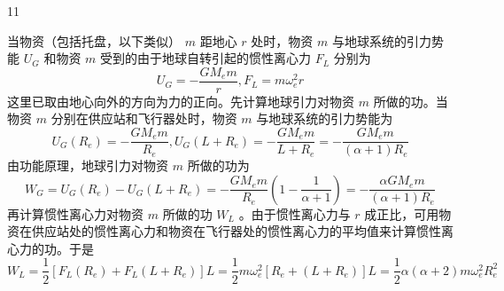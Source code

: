 \begin{solution}{11}
\begin{subsolution}
当物资（包括托盘，以下类似） $m$ 距地心 $r$ 处时，物资 $m$ 与地球系统的引力势能 $U_{G}$ 和物资 $m$ 受到的由于地球自转引起的惯性离心力 $F_{L}$ 分别为
\begin{equation}
U _ {G} = - \frac {G M _ {e} m}{r}, F _ {L} = m \omega_ {e} ^ {2} r
\label{eq:1.s11}
\end{equation}
这里已取由地心向外的方向为力的正向。先计算地球引力对物资 $m$ 所做的功。当物资 $m$ 分别在供应站和飞行器处时，物资 $m$ 与地球系统的引力势能为
\begin{equation}
U _ {G} \left(R _ {e}\right) = - \frac {G M _ {e} m}{R _ {e}}, U _ {G} \left(L + R _ {e}\right) = - \frac {G M _ {e} m}{L + R _ {e}} = - \frac {G M _ {e} m}{(\alpha + 1) R _ {e}}
\label{eq:2.s11}
\end{equation}
由功能原理，地球引力对物资 $m$ 所做的功为
\begin{equation}
W _ {G} = U _ {G} \left(R _ {e}\right) - U _ {G} \left(L + R _ {e}\right) = - \frac {G M _ {e} m}{R _ {e}} \left(1 - \frac {1}{\alpha + 1}\right) = - \frac {\alpha G M _ {e} m}{(\alpha + 1) R _ {e}}
\label{eq:3.s11}
\end{equation}
再计算惯性离心力对物资 $m$ 所做的功 $W_{L}$ 。由于惯性离心力与 $r$ 成正比，可用物资在供应站处的惯性离心力和物资在飞行器处的惯性离心力的平均值来计算惯性离心力的功。于是
\begin{equation}
W _ {L} = \frac {1}{2} \left[ F _ {L} \left(R _ {e}\right) + F _ {L} \left(L + R _ {e}\right) \right] L = \frac {1}{2} m \omega_ {e} ^ {2} \left[ R _ {e} + \left(L + R _ {e}\right) \right] L = \frac {1}{2} \alpha (\alpha + 2) m \omega_ {e} ^ {2} R _ {e} ^ {2}
\label{eq:4.s11}
\end{equation}
\end{subsolution}


\end{solution}
